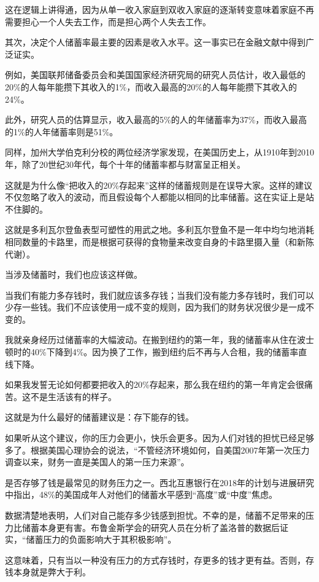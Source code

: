 这在逻辑上讲得通，因为从单一收入家庭到双收入家庭的逐渐转变意味着家庭不再需要担心一个人失去工作，而是担心两个人失去工作。

其次，决定个人储蓄率最主要的因素是收入水平。这一事实已在金融文献中得到广泛证实。

例如，美国联邦储备委员会和美国国家经济研究局的研究人员估计，收入最低的20\%的人每年能攒下其收入的1\%，而收入最高的20\%的人每年能攒下其收入的24\%。

此外，研究人员的估算显示，收入最高的5\%的人的年储蓄率为37\%，而收入最高的1\%的人年储蓄率则是51\%。

同样，加州大学伯克利分校的两位经济学家发现，在美国历史上，从1910年到2010年，除了20世纪30年代，每个十年的储蓄率都与财富呈正相关。

这就是为什么像“把收入的20\%存起来”这样的储蓄规则是在误导大家。这样的建议不仅忽略了收入的波动，而且假设每个人都能以相同的比率储蓄。这在实证上是站不住脚的。

这就是多利瓦尔登鱼表型可塑性的用武之地。多利瓦尔登鱼不是一年中均匀地消耗相同数量的卡路里，而是根据可获得的食物量来改变自身的卡路里摄入量（和新陈代谢）。

当涉及储蓄时，我们也应该这样做。

当我们有能力多存钱时，我们就应该多存钱；当我们没有能力多存钱时，我们可以少存一些钱。我们不应该使用一成不变的规则，因为我们的财务状况很少是一成不变的。

我就亲身经历过储蓄率的大幅波动。在搬到纽约的第一年，我的储蓄率从住在波士顿时的40\%下降到4\%。因为换了工作，搬到纽约后不再与人合租，我的储蓄率直线下降。

如果我发誓无论如何都要把收入的20\%存起来，那么我在纽约的第一年肯定会很痛苦。这不是生活该有的样子。

这就是为什么最好的储蓄建议是：存下能存的钱。

如果听从这个建议，你的压力会更小，快乐会更多。因为人们对钱的担忧已经足够多了。根据美国心理协会的说法，“不管经济环境如何，自美国2007年第一次压力调查以来，财务一直是美国人的第一压力来源”。

是否存够了钱是最常见的财务压力之一。西北互惠银行在2018年的计划与进展研究中指出，48\%的美国成年人对他们的储蓄水平感到“高度”或“中度”焦虑。

数据清楚地表明，人们对自己能存多少钱感到担忧。不幸的是，储蓄不足带来的压力比储蓄本身更有害。布鲁金斯学会的研究人员在分析了盖洛普的数据后证实，“储蓄压力的负面影响大于其积极影响”。

这意味着，只有当以一种没有压力的方式存钱时，存更多的钱才更有益。否则，存钱本身就是弊大于利。

